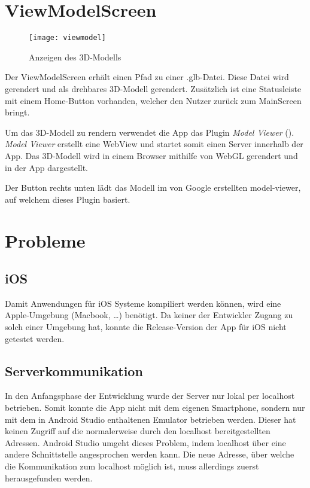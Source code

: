 \clearpage
\section{ViewModelScreen}
\begin{figure}[htpb]
    \centering
    \texttt{[image: viewmodel]}
    \caption{Anzeigen des 3D-Modells}
    \label{img:viewmodel}
\end{figure}

Der ViewModelScreen erhält einen Pfad zu einer .glb-Datei. Diese Datei wird gerendert und als drehbares 3D-Modell gerendert. Zusätzlich ist eine Statusleiste mit einem Home-Button 
vorhanden, welcher den Nutzer zurück zum MainScreen bringt. 

Um das 3D-Modell zu rendern verwendet die App das Plugin \textit{Model Viewer} (\cite{misc:modelviewer}). \textit{Model Viewer} erstellt eine WebView und startet somit einen Server 
innerhalb der App. Das 3D-Modell wird in einem Browser mithilfe von WebGL gerendert und in der App dargestellt.

Der Button rechts unten lädt das Modell im von Google erstellten model-viewer, auf welchem dieses Plugin basiert.

\pagebreak
\section{Probleme}

\subsection{iOS}

Damit Anwendungen für iOS Systeme kompiliert werden können, wird eine Apple-Umgebung (Macbook, \dots) benötigt. Da keiner der Entwickler Zugang zu solch einer Umgebung hat, konnte die 
Release-Version der App für iOS nicht getestet werden.

\subsection{Serverkommunikation}

In den Anfangsphase der Entwicklung wurde der Server nur lokal per localhost betrieben. Somit konnte die App nicht mit dem eigenen Smartphone, sondern nur mit dem in Android Studio 
enthaltenen Emulator betrieben werden. Dieser hat keinen Zugriff auf die normalerweise durch den localhost bereitgestellten Adressen. Android Studio umgeht dieses Problem, indem 
localhost über eine andere Schnittstelle angesprochen werden kann. Die neue Adresse, über welche die Kommunikation zum localhost möglich ist, muss allerdings zuerst herausgefunden werden.

